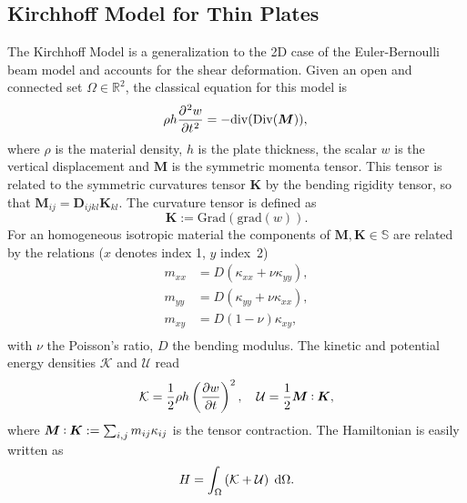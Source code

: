 \documentclass[letterpaper, 10 pt, conference]{ieeeconf}
\def\onedot{$\mathsurround0pt\ldotp$}
\def\cddot{%
	\mathbin{\vcenter{\baselineskip.67ex
			\hbox{\onedot}\hbox{\onedot}}%
}}
\begin{document}
\subsection{Kirchhoff Model for Thin Plates}
\label{subsec:classMin}
The Kirchhoff Model is a generalization to the 2D case of the Euler-Bernoulli beam model and accounts for the shear deformation. Given an open and connected set $\Omega \in \mathbb{R}^2$, the classical equation for this model \cite{timoshenko1959theory} is 
\begin{equation}
\displaystyle \rho h \diffp[2]{w}{t} = -\mathrm{div}(\mathrm{Div}(\bm{M})), \\
\end{equation}
where $\rho$ is the material density, $h$ is the plate thickness, the scalar $w$ is the vertical displacement and $\bm{M}$ is the symmetric momenta tensor.  This tensor is related to the symmetric curvatures tensor $\bm{K}$ by the bending rigidity tensor, so that $\bm{M}_{ij} = \bm{D}_{ijkl} \bm{K}_{kl}$. The curvature tensor is defined as
\begin{equation*}
\bm{K} := \mathrm{Grad}(\mathrm{grad}(w)).
\end{equation*}
For an homogeneous isotropic material the components of $\bm{M}, \bm{K} \in \mathbb{S}$ are related by the relations ($x$ denotes index 1, $y$ index~2)
\begin{equation*}
\begin{aligned}
m_{xx} &= D\left(\kappa_{xx} + \nu \kappa_{yy}\right),\\
m_{yy} &= D\left(\kappa_{yy} + \nu \kappa_{xx}\right),\\
m_{xy} &= D(1 - \nu) \kappa_{xy}, \\
\end{aligned}
\end{equation*}
with $\nu$ the Poisson's ratio, $D$ the bending modulus. The kinetic and potential energy densities $\mathcal{K}$ and $\mathcal{U}$ read
\begin{equation}
\mathcal{K} =  \frac{1}{2}\rho h \left(\diffp{w}{t} \right)^2, \quad
\mathcal{U} = \frac{1}{2} \bm{M} \cddot \bm{K},
\end{equation} 
where $\bm{M} \cddot \bm{K} := \sum_{i,j} m_{ij} \kappa_{ij}$ is the tensor contraction. The Hamiltonian  is easily written as
\begin{equation} 
H = \int_{\Omega} \left( \mathcal{K} + \mathcal{U} \right)   \d\Omega. 
\end{equation}
\end{document}
